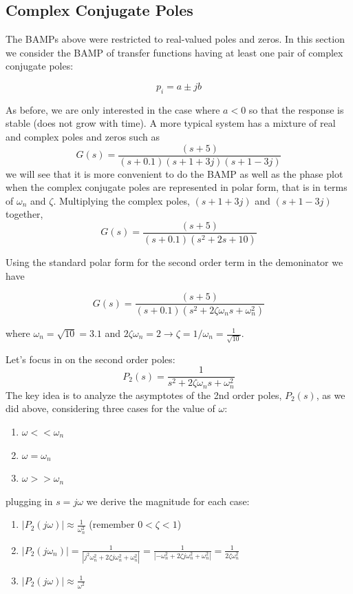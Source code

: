 \subsection{Complex Conjugate Poles}

The BAMPs above were restricted to real-valued poles and zeros.  In this section we consider the BAMP of transfer functions having at least one pair of complex conjugate poles:

\[
p_i = a \pm jb
\]

As before, we are only interested in the case where $a<0$ so that the response is stable (does not grow with time).  A more typical system has a mixture of real and complex poles and zeros such as
\[
G(s) =  \frac {(s+5)} {(s+0.1)(s+1+3j)(s+1-3j)}
\]
we will see that it is more convenient to do the BAMP as well as the phase plot when the complex conjugate poles are represented in polar form, that is in terms of $\omega_n$ and $\zeta$.  Multiplying the complex poles,
$(s+1+3j)$ and $(s+1-3j)$ together,
\[
G(s) = \frac  {(s+5)}  {(s+0.1) (s^2 + 2s + 10 )  }
\]

Using the standard polar form for the second order term in the demoninator we have

\[
G(s) = \frac  {(s+5)}  {(s+0.1) (s^2 + 2\zeta\omega_n s + \omega_n^2)}
\]

where $\omega_n = \sqrt{10} = 3.1$ and $2\zeta\omega_n = 2 \to \zeta = 1/\omega_n = \frac{1}{\sqrt{10}} $.

Let's focus in on the second order poles:
\[
P_2(s) =   \frac {1}{s^2 + 2\zeta\omega_n s + \omega_n^2 }
\]
The key idea is to analyze the asymptotes of the 2nd order poles, $P_2(s)$, as we did above,  considering three
cases for the value of $\omega$:

\begin{enumerate}
  \item $\omega << \omega_n$
  \item $\omega =  \omega_n$
  \item $\omega >> \omega_n$
\end{enumerate}

plugging in $s=j\omega$  we derive the magnitude for each case:

\begin{enumerate}
  \item $|P_2(j\omega)| \approx \frac {1}{\omega_n^2}$ (remember $0< \zeta < 1$)


  \item $|P_2(j\omega_n)| = \frac  {1}{|j^2\omega_n^2 + 2\zeta j \omega_n^2 + \omega_n^2|}  =
                               \frac{1}{|-\omega_n^2 + 2\zeta j \omega_n^2 + \omega_n^2|} =
                               \frac{1}{2\zeta \omega_n^2}$

  \item $|P_2(j\omega)| \approx \frac {1}{\omega^2}$
\end{enumerate}

